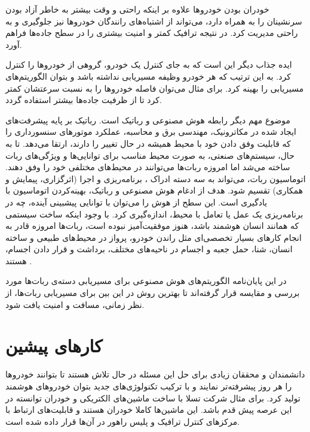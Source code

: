 خودران بودن خودروها علاوه بر اینکه راحتی و وقت بیشتر به خاطر آزاد بودن سرنشینان را به همراه دارد، می‌تواند از اشتباه‌های رانندگان خودروها نیز جلوگیری و به راحتی مدیریت کرد. در نتیجه ترافیک کمتر و امنیت بیشتری را در سطح جاده‌ها فراهم آورد.

ایده جذاب دیگر این است که به جای کنترل یک خودرو، گروهی از خودروها را کنترل کرد. به این ترتیب که هر خودرو وظیفه مسیریابی نداشته باشد و بتوان الگوریتم‌های مسیریابی را بهینه کرد. برای مثال می‌توان فاصله خودروها را به نسبت سرعتشان کمتر کرد تا از ظرفیت جاده‌ها بیشتر استفاده گردد.

موضوع مهم دیگر رابطه هوش مصنوعی و رباتیک است. رباتیک بر پایه پیشرفت‌های ایجاد شده در مکاترونیک، مهندسی برق و محاسبه، عملکرد موتورهای سنسورداری را که قابلیت وفق دادن خود با محیط همیشه در حال تغییر را دارند، ارتقا می‌دهد. تا به حال، سیستم‌های صنعتی، به صورت محیط مناسب برای توانایی‌ها و ویژگی‌های ربات ساخته می‌شد اما امروزه ربات‌ها می‌توانند در محیط‌‌های مختلفی خود را وفق دهند.
اتوماسیون ربات، می‌تواند به سه دسته ادراک ، برنامه‌ریزی و اجرا (اثرگزاری، پیمایش و همکاری) تقسیم شود. هدف از ادغام هوش مصنوعی و رباتیک، بهینه‌کردن اتوماسیون با یادگیری است. این سطح از هوش را می‌توان با توانایی پیشبینی آینده، چه در برنامه‌ریزی یک عمل یا تعامل با محیط، اندازه‌گیری کرد. با وجود اینکه ساخت سیستمی که همانند انسان هوشمند باشد، هنوز موفقیت‌آمیز نبوده است، ربات‌ها امروزه قادر به انجام کارهای بسیار تخصصی‌ای مثل راندن خودرو، پرواز در محیط‌های طبیعی و ساخته انسان، شنا، حمل جعبه و اجسام در ناحیه‌های مختلف، برداشت و قرار دادن اجسام، هستند \cite{perez2018artificial}.

در این پایان‌نامه الگوریتم‌های هوش مصنوعی برای مسیریابی دسته‌ی ربات‌ها مورد بررسی و مقایسه قرار گرفته‌اند تا بهترین روش در این بین برای مسیریابی ربات‌ها، از نظر زمانی، مسافت و امنیت یافت شود.

\section{کارهای پیشین}
دانشمندان و محققان زیادی برای حل این مسئله در حال تلاش هستند تا بتوانند خودروها را هر روز پیشرفته‌تر نمایند و با ترکیب تکنولوژی‌های جدید بتوان خودروهای هوشمند تولید کرد. برای مثال شرکت تسلا با ساخت ماشین‌های الکتریکی و خودران توانسته در این عرصه پیش قدم باشد. این ماشین‌ها کاملا خودران هستند و قابلیت‌های ارتباط با مرکزهای کنترل ترافیک و پلیس راهور در آن‌ها قرار داده شده است.

